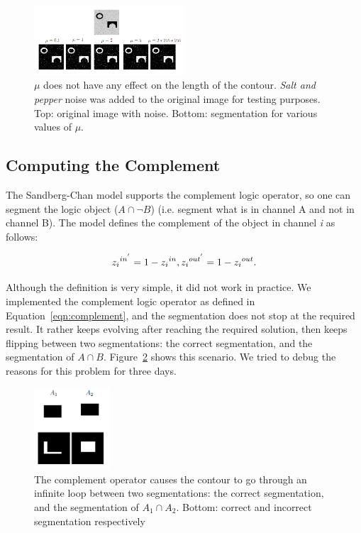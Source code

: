 \documentclass[10pt,twocolumn,letterpaper]{article}
\begin{document}
\begin{figure}[t]
\centering
\includegraphics[width=0.5\textwidth]{cvmu.png}
\caption{$\mu$ does not have any effect on the length of the contour. \textit{Salt and pepper} noise was added to the original image for testing
purposes. Top: original image with noise. Bottom: segmentation for various values of $\mu$.}
\label{fig:cvmu}
\end{figure}

\subsection{Computing the Complement}
The Sandberg-Chan model supports the complement logic operator, so one can segment the logic object ($A \cap \neg B$) (i.e. segment what is in channel A and not
in channel B). The model defines the complement of the object in channel \textit{i} as follows:

\begin{equation}
\label{eqn:complement}
{z_{i}}^{in^{'}} = 1 - {z_{i}}^{in}, \\
{z_{i}}^{out^{'}} = 1 - {z_{i}}^{out}.
\end{equation}

Although the definition is very simple, it did not work in practice. We implemented the complement logic operator as defined in Equation~\ref{eqn:complement},
and the segmentation does not stop at the required result. It rather keeps evolving after reaching the required solution, then keeps
flipping between two segmentations: the correct segmentation, and the segmentation of $A \cap B$. Figure~\ref{fig:sccomp} shows this scenario. We tried to
debug the reasons for this problem for three days.

\begin{figure}[t]
\centering
\includegraphics[width=0.25\textwidth]{sccomp.png}
\caption{The complement operator causes the contour to go through an infinite loop between two segmentations: the correct segmentation, and the segmentation
of $A_1 \cap A_2$. Bottom: correct and incorrect segmentation respectively}
\label{fig:sccomp}
\end{figure}
\end{document}
